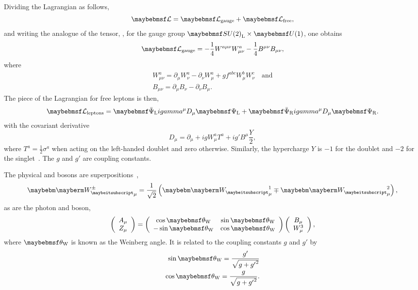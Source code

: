 Dividing the Lagrangian as follows,
\begin{equation*}
\lagrangiand = \lagrangiand_{\textrm{gauge}} + \lagrangiand_{\textrm{free}},
\end{equation*}
and writing the analogue of the tensor, \Fmunu, for the gauge group
$\SUtwo_{\textrm{L}}\times\Uone$, one obtains
\begin{equation*}
\lagrangiand_{\textrm{gauge}} = -\frac{1}{4} W^{a\mu\nu} W^a_{\mu\nu}
-\frac{1}{4} B^{\mu\nu}B_{\mu\nu},
\end{equation*}
where
\begin{eqnarray*}
W^{a}_{\mu\nu} = \partial_{\mu} W^a_{\nu} - \partial_{\nu}W^a_{\mu} + g f^{abc}
W^{b}_{\mu} W^c_{\nu}\quad\textrm{and}\\
B_{\mu\nu} = \partial_{\mu} B_{\nu} - \partial_{\nu} B_{\mu}.
\end{eqnarray*}
The piece of the Lagrangian for free leptons is then,
\begin{equation*}
\lagrangiand_{\textrm{leptons}} = \APsiL i \gamma^{\mu} D_{\mu} \PsiL + \APsiR i
\gamma^{\mu} D_{\mu} \PsiR.
\end{equation*}
with the covariant derivative
\begin{equation*}
D_{\mu} = \partial_{\mu} + i g W^a_{\mu} T^a + i g' B^{\mu}\frac{Y}{2},
\end{equation*}
where $T^a = \frac{1}{2}\sigma^a$ when acting on the left-handed doublet and
zero otherwise. Similarly, the hypercharge $Y$ is $-1$ for the doublet and $-2$
for the singlet~\cite{sm_intro}. The $g$ and $g'$ are coupling constants.

The physical \PWp and \PWm bosons are superpositions~\cite{sm_intro},
\begin{equation*}
\PWpm_{\mu} = \frac{1}{\sqrt{2}}\left(\PW^1_{\mu} \mp \PW^2_{\mu}\right),
\end{equation*}
as are the photon and \PZ boson,
\begin{equation*}
\left(\begin{array}{c}A_{\mu} \\ Z_{\mu} \end{array}\right ) =
  \left ( \begin{array}{cc} \cos\thetaw & \sin\thetaw \\ -\sin\thetaw &
      \cos\thetaw\end{array}\right)
\left ( \begin{array}{c} B_{\mu} \\ W^3_{\mu} \end{array} \right ),
\end{equation*}
where $\thetaw$ is known as the Weinberg angle. It is related to the coupling
constants $g$ and $g'$ by
\begin{eqnarray}
\sin\thetaw = \frac{g'}{\sqrt{g + {g'}^2}} \\
\cos\thetaw = \frac{g}{\sqrt{g + {g'}^2}}.
\end{eqnarray}

